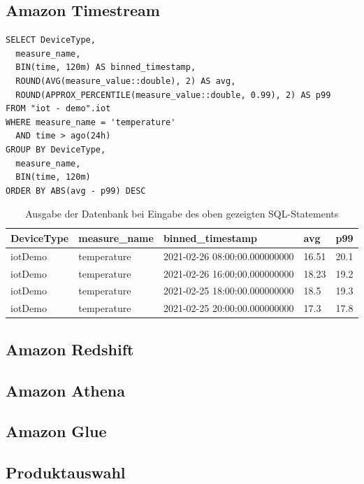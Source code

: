 \subsection{Amazon Timestream}
\lstset{language=SQL} 
\begin{lstlisting}
SELECT DeviceType,
  measure_name,
  BIN(time, 120m) AS binned_timestamp,
  ROUND(AVG(measure_value::double), 2) AS avg,
  ROUND(APPROX_PERCENTILE(measure_value::double, 0.99), 2) AS p99 
FROM "iot - demo".iot 
WHERE measure_name = 'temperature' 
  AND time > ago(24h) 
GROUP BY DeviceType,
  measure_name,
  BIN(time, 120m) 
ORDER BY ABS(avg - p99) DESC
\end{lstlisting}

\begin{table}[H]
\centering
\begin{tabular}{|l|l|l|l|l|}
\hline
DeviceType & measure\_name & binned\_timestamp & avg & p99 \\ \hline
iotDemo & temperature & 2021-02-26 08:00:00.000000000 & 16.51 & 20.1 \\ \hline
iotDemo & temperature & 2021-02-26 16:00:00.000000000 & 18.23 & 19.2 \\ \hline
iotDemo & temperature & 2021-02-25 18:00:00.000000000 & 18.5 & 19.3 \\ \hline
iotDemo & temperature & 2021-02-25 20:00:00.000000000 & 17.3 & 17.8 \\ \hline
\end{tabular}
\caption{Ausgabe der Datenbank bei Eingabe des oben gezeigten SQL-Statements}
\label{tab:AusgabeSQL}
\end{table}

\subsection{Amazon Redshift}

\subsection{Amazon Athena}

\subsection{Amazon Glue}

\subsection{Produktauswahl}